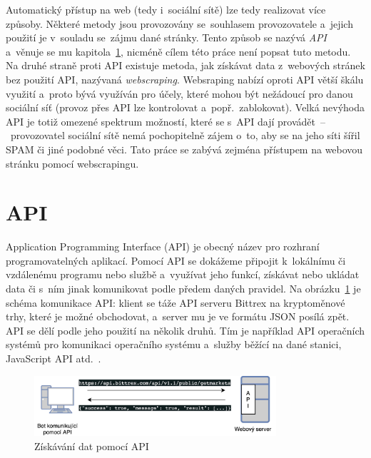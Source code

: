 Automatický přístup na web (tedy i~sociální sítě) lze tedy realizovat více způsoby. Některé metody jsou provozovány se~souhlasem provozovatele a~jejich použití je v~souladu se~zájmu dané stránky. Tento způsob se nazývá \textit{API} a~věnuje se mu kapitola~\ref{sec:api}, nicméně cílem této práce není popsat tuto metodu. Na druhé straně proti API existuje metoda, jak získávat data z~webových stránek bez použití API, nazývaná \textit{webscraping}. Websraping nabízí oproti API větší škálu využití a~proto bývá využíván pro účely, které mohou být nežádoucí pro danou sociální síť (provoz přes API lze kontrolovat a~popř.~zablokovat). Velká nevýhoda API je totiž omezené spektrum možností, které se s~API dají provádět~--~provozovatel sociální sítě nemá pochopitelně zájem o~to, aby se na jeho síti šířil SPAM či jiné podobné věci. Tato práce se zabývá zejména přístupem na webovou stránku pomocí webscrapingu.

\section{API}
\label{sec:api}
Application Programming Interface (API) je obecný název pro rozhraní programovatelných aplikací. Pomocí API se dokážeme připojit k~lokálnímu či vzdálenému programu nebo službě a~využívat jeho funkcí, získávat nebo ukládat data či s~ním jinak komunikovat podle předem daných pravidel. Na obrázku~\ref{img:api} je schéma komunikace API: klient se táže API serveru Bittrex na kryptoměnové trhy, které je možné obchodovat, a~server mu je ve formátu JSON posílá zpět. API se dělí podle jeho použití na několik druhů. Tím je například API operačních systémů pro komunikaci operačního systému a~služby běžící na dané stanici, JavaScript API atd.~\cite{bib:API_introduction}. 

\begin{figure}[hbt]
	\centering
	\includegraphics[width=0.8\textwidth]{images/API.jpg}
	\caption{Získávání dat pomocí API}
	\label{img:api}
\end{figure}

